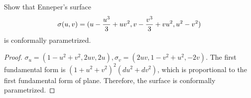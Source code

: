 \begin{problem}
Show that Enneper's surface 
\begin{equation}
\sigma(u,v)=(u-{u^3\over 3}+uv^2, v-{v^3 \over 3}+vu^2,u^2-v^2)
\end{equation}
is conformally parametrized.
\end{problem}
\begin{solution}
\begin{proof}
$\sigma_u = (1- u^2+v^2,2uv,2u), \sigma_v = (2uv,1-v^2+u^2,-2v)$.
The first fundamental form is $(1+u^2+v^2)^2 (du^2+dv^2)$, which is proportional to the first fundamental form of plane. Therefore, the surface is conformally parametrized.
\end{proof}
\end{solution}


